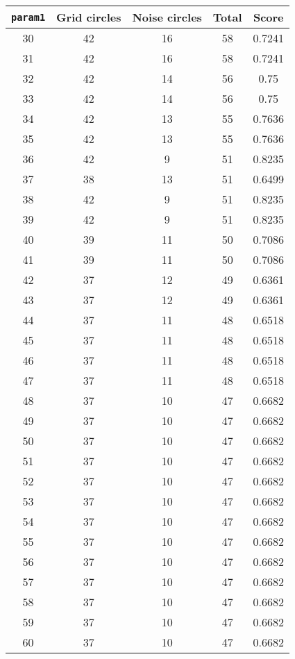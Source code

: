 \documentclass[letterpaper, 12pt]{article}
\begin{document}
\begin{longtable}{|c|c|c|c|c|}
\hline
\textbf{\texttt{param1}} & \textbf{Grid circles} & \textbf{Noise circles} & \textbf{Total} & \textbf{Score} \\
\hline
30 & 42 & 16 & 58 & 0.7241 \\
\hline
31 & 42 & 16 & 58 & 0.7241 \\
\hline
32 & 42 & 14 & 56 & 0.75 \\
\hline
33 & 42 & 14 & 56 & 0.75 \\
\hline
34 & 42 & 13 & 55 & 0.7636 \\
\hline
35 & 42 & 13 & 55 & 0.7636 \\
\hline
36 & 42 & 9 & 51 & 0.8235 \\
\hline
37 & 38 & 13 & 51 & 0.6499 \\
\hline
38 & 42 & 9 & 51 & 0.8235 \\
\hline
39 & 42 & 9 & 51 & 0.8235 \\
\hline
40 & 39 & 11 & 50 & 0.7086 \\
\hline
41 & 39 & 11 & 50 & 0.7086 \\
\hline
42 & 37 & 12 & 49 & 0.6361 \\
\hline
43 & 37 & 12 & 49 & 0.6361 \\
\hline
44 & 37 & 11 & 48 & 0.6518 \\
\hline
45 & 37 & 11 & 48 & 0.6518 \\
\hline
46 & 37 & 11 & 48 & 0.6518 \\
\hline
47 & 37 & 11 & 48 & 0.6518 \\
\hline
48 & 37 & 10 & 47 & 0.6682 \\
\hline
49 & 37 & 10 & 47 & 0.6682 \\
\hline
50 & 37 & 10 & 47 & 0.6682 \\
\hline
51 & 37 & 10 & 47 & 0.6682 \\
\hline
52 & 37 & 10 & 47 & 0.6682 \\
\hline
53 & 37 & 10 & 47 & 0.6682 \\
\hline
54 & 37 & 10 & 47 & 0.6682 \\
\hline
55 & 37 & 10 & 47 & 0.6682 \\
\hline
56 & 37 & 10 & 47 & 0.6682 \\
\hline
57 & 37 & 10 & 47 & 0.6682 \\
\hline
58 & 37 & 10 & 47 & 0.6682 \\
\hline
59 & 37 & 10 & 47 & 0.6682 \\
\hline
60 & 37 & 10 & 47 & 0.6682 \\

\end{longtable}
\end{document}
